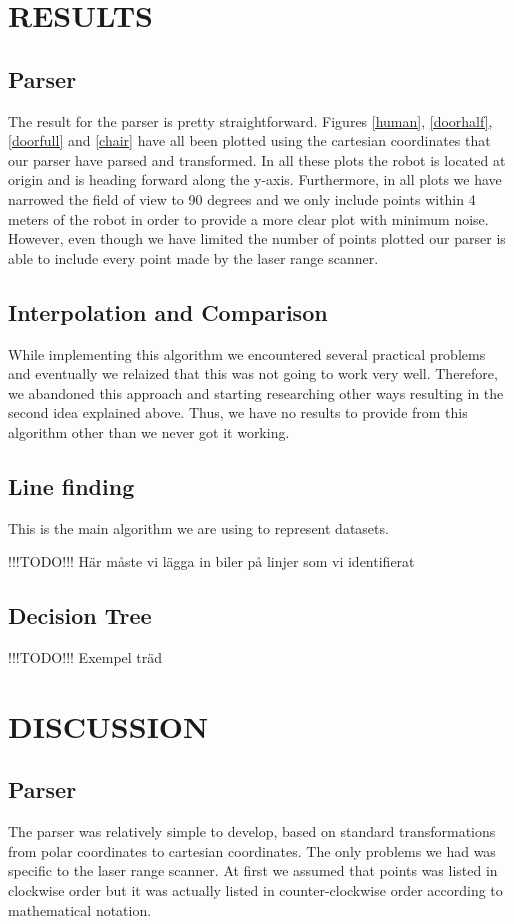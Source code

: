 \documentclass[a4paper, 10pt, conference]{ieeeconf}      %
\begin{document}
\section{RESULTS}

\subsection{Parser}
The result for the parser is pretty straightforward. Figures \ref{human}, \ref{doorhalf}, \ref{doorfull} and \ref{chair} have all been plotted using the cartesian coordinates that our parser have parsed and transformed. In all these plots the robot is located at origin and is heading forward along the y-axis. Furthermore, in all plots we have narrowed the field of view to 90 degrees and we only include points within 4 meters of the robot in order to provide a more clear plot with minimum noise. However, even though we have limited the number of points plotted our parser is able to include every point made by the laser range scanner.

\subsection{Interpolation and Comparison}
While implementing this algorithm we encountered several practical problems and eventually we relaized that this was not going to work very well. Therefore, we abandoned this approach and starting researching other ways resulting in the second idea explained above. Thus, we have no results to provide from this algorithm other than we never got it working.

\subsection{Line finding}
This is the main algorithm we are using to represent datasets. 

!!!TODO!!! Här måste vi lägga in biler på linjer som vi identifierat

\subsection{Decision Tree}
!!!TODO!!! Exempel träd

\section{DISCUSSION}

\subsection{Parser}
The parser was relatively simple to develop, based on standard transformations from polar coordinates to cartesian coordinates. The only problems we had was specific to the laser range scanner. At first we assumed that points was listed in clockwise order but it was actually listed in counter-clockwise order according to mathematical notation.
\end{document}
